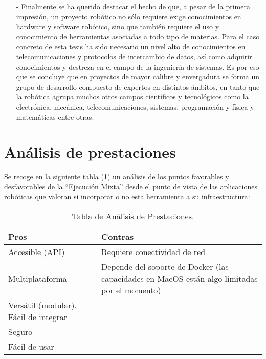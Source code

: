 \begin{itemize}
    \item [-] Finalmente se ha querido destacar el hecho de que, a pesar de la primera impresión, un proyecto robótico no sólo requiere exige conocimientos en hardware y software robótico, sino que también requiere el uso y conocimiento de herramientas asociadas a todo tipo de materias. Para el caso concreto de esta tesis ha sido necesario un nivel alto de conocimientos en telecomunicaciones y protocolos de intercambio de datos, así como adquirir conocimientos y destreza en el campo de la ingeniería de sistemas. Es por eso que se concluye que en proyectos de mayor calibre y envergadura se forma un grupo de desarrollo compuesto de expertos en distintos ámbitos, en tanto que la robótica agrupa muchos otros campos científicos y tecnológicos como la electrónica, mecánica, telecomunicaciones, sistemas, programación y física y matemáticas entre otras.
\end{itemize}

\section{Análisis de prestaciones}
Se recoge en la siguiente tabla (\ref{tabla:prestaciones}) un análisis de los puntos favorables y desfavorables de la ``Ejecución Mixta'' desde el punto de vista de las aplicaciones robóticas que valoran si incorporar o no esta herramienta a su infraestructura:

\begin{table}[htbp]
\begin{center}
\begin{tabular}{| p{5cm}| p{8cm} |}
\hline
Pros & Contras \\
\hline \hline
Accesible (API) & Requiere conectividad de red \\ \hline
Multiplataforma & Depende del soporte de Docker (las capacidades en MacOS están algo limitadas por el momento)\\ \hline
Versátil (modular). Fácil de integrar &   \\ \hline
Seguro &   \\ \hline
Fácil de usar &   \\ \hline
\end{tabular}
\caption{Tabla de Análisis de Prestaciones.}
\label{tabla:prestaciones}
\end{center}
\end{table}

